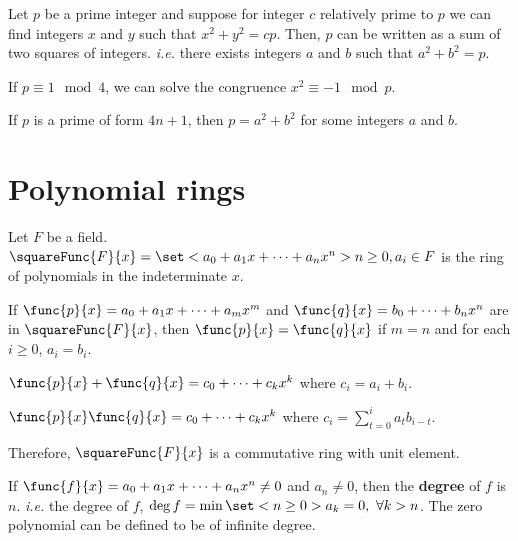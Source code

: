 \begin{lemma}
    Let \(p\) be a prime integer and suppose for integer \(c\) relatively prime to \(p\) we can find integers \(x\) and \(y\) such that \(x^2 + y^2 = cp\). Then, \(p\) can be written as a sum of two squares of integers. \textit{i.e.} there exists integers \(a\) and \(b\) such that \(a^2 + b^2 = p\).
\end{lemma}

\begin{lemma}
    If \(p \equiv 1 \mod{4}\), we can solve the congruence \(x^2 \equiv -1 \mod{p}\).
\end{lemma}

\begin{theorem}
    If \(p\) is a prime of form \(4n + 1\), then \(p = a^2 + b^2\) for some integers \(a\) and \(b\).
\end{theorem}

\section{Polynomial rings}
Let \(F\) be a field. \(\squareFunc{F}{x} = \set<a_0 + a_1 x + \dots + a_nx^n>{n \geq 0, a_i \in F}\) is the ring of polynomials in the indeterminate \(x\).

\begin{definition}
    If \(\func{p}{x} = a_0 + a_1 x + \dots + a_m x^m\) and \(\func{q}{x} = b_0 + \dots + b_nx^n\) are in \(\squareFunc{F}{x}\), then \(\func{p}{x} = \func{q}{x}\) if \(m = n\) and for each \(i \geq 0\), \(a_i = b_i\).
\end{definition}

\begin{definition}
    \(\func{p}{x} + \func{q}{x} = c_0 + \dots + c_k x^k\) where \(c_i = a_i + b_i\).
\end{definition}

\begin{definition}
    \(\func{p}{x} \func{q}{x} = c_0 + \dots + c_k x^k\) where \(c_i = \sum_{t = 0}^i a_t b_{i - t}\).
\end{definition}

Therefore, \(\squareFunc{F}{x}\) is a commutative ring with unit element.

\begin{definition}
    If \(\func{f}{x} = a_0 + a_1 x + \dots + a_n x^n \neq 0\) and \(a_n \neq 0\), then the \textbf{degree} of \(f\) is \(n\). \textit{i.e.} the degree of \(f\), \(\deg f = \min\set<n \geq 0>{a_k =0,\ \forall k > n}\). The zero polynomial can be defined to be of infinite degree. 
 \end{definition}

